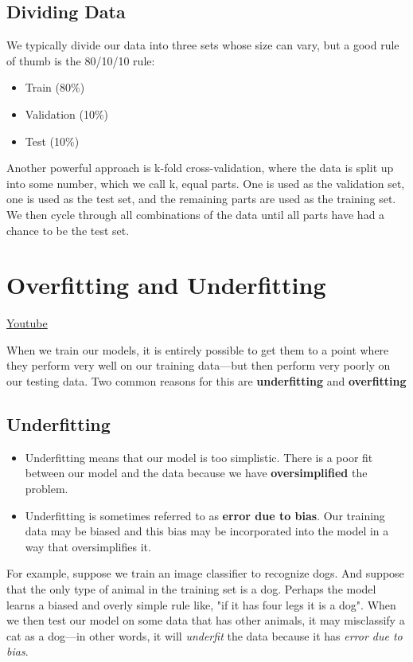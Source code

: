 \subsection{Dividing Data}

We typically divide our data into three sets whose size can vary, but a good rule of thumb is the 80/10/10 rule:

\begin{itemize}
    \item Train (80\%)
    \item Validation (10\%)
    \item Test (10\%)
\end{itemize}
Another powerful approach is k-fold cross-validation, where the data is split up into some number, which we call k, equal parts. One is used as the validation set, one is used as the test set, and the remaining parts are used as the training set. We then cycle through all combinations of the data until all parts have had a chance to be the test set.

\section{Overfitting and Underfitting}
\href{https://www.youtube.com/watch?v=xj4PlXMsN-Y&ab_channel=Udacity}{Youtube} \newline

When we train our models, it is entirely possible to get them to a point where they perform very well on our training data—but then perform very poorly on our testing data. Two common reasons for this are \textbf{underfitting} and \textbf{overfitting}

\subsection{Underfitting}

\begin{itemize}
    \item Underfitting means that our model is too simplistic. There is a poor fit between our model and the data because we have \textbf{oversimplified} the problem.
    \item Underfitting is sometimes referred to as \textbf{error due to bias}. Our training data may be biased and this bias may be incorporated into the model in a way that oversimplifies it.
\end{itemize}
For example, suppose we train an image classifier to recognize dogs. And suppose that the only type of animal in the training set is a dog. Perhaps the model learns a biased and overly simple rule like, "if it has four legs it is a dog". When we then test our model on some data that has other animals, it may misclassify a cat as a dog—in other words, it will \textit{underfit} the data because it has \textit{error due to bias}.

